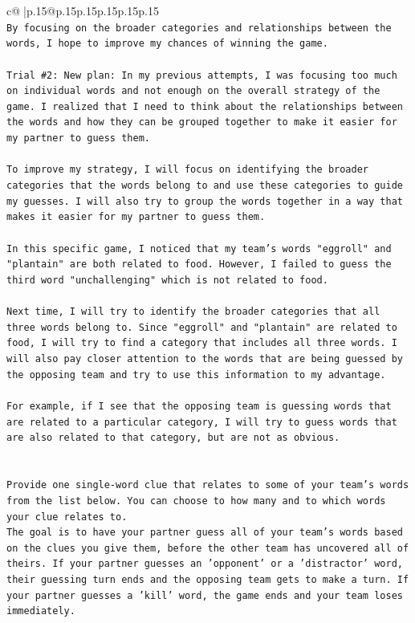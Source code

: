 \documentclass{article}
\begin{document}
{\begin{supertabular}{c@{$\;$}|p{.15\linewidth}@{}p{.15\linewidth}p{.15\linewidth}p{.15\linewidth}p{.15\linewidth}p{.15\linewidth}}
{{{\\ 
\texttt{By focusing on the broader categories and relationships between the words, I hope to improve my chances of winning the game.} \\
\\ 
\texttt{Trial \#2: New plan: In my previous attempts, I was focusing too much on individual words and not enough on the overall strategy of the game. I realized that I need to think about the relationships between the words and how they can be grouped together to make it easier for my partner to guess them. } \\
\\ 
\texttt{To improve my strategy, I will focus on identifying the broader categories that the words belong to and use these categories to guide my guesses. I will also try to group the words together in a way that makes it easier for my partner to guess them. } \\
\\ 
\texttt{In this specific game, I noticed that my team's words "eggroll" and "plantain" are both related to food. However, I failed to guess the third word "unchallenging" which is not related to food. } \\
\\ 
\texttt{Next time, I will try to identify the broader categories that all three words belong to. Since "eggroll" and "plantain" are related to food, I will try to find a category that includes all three words. I will also pay closer attention to the words that are being guessed by the opposing team and try to use this information to my advantage. } \\
\\ 
\texttt{For example, if I see that the opposing team is guessing words that are related to a particular category, I will try to guess words that are also related to that category, but are not as obvious.} \\
\\ 
\\ 
\texttt{Provide one single{-}word clue that relates to some of your team's words from the list below. You can choose to how many and to which words your clue relates to.} \\
\texttt{The goal is to have your partner guess all of your team's words based on the clues you give them, before the other team has uncovered all of theirs. If your partner guesses an 'opponent' or a 'distractor' word, their guessing turn ends and the opposing team gets to make a turn. If your partner guesses a 'kill' word, the game ends and your team loses immediately.} \\
}}}
\end{supertabular}}
\end{document}
